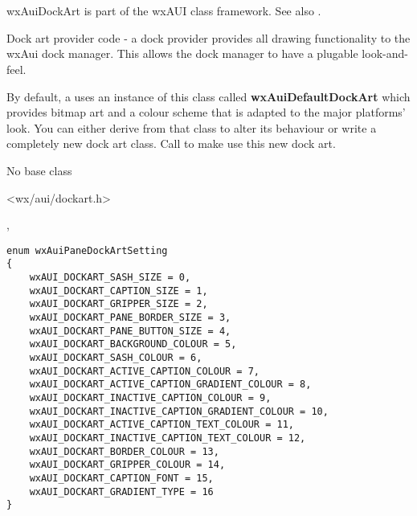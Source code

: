 %
%

\section{}\label{wxauidockart}

wxAuiDockArt is part of the wxAUI class framework.
See also .

Dock art provider code - a dock provider provides all drawing
functionality to the wxAui dock manager. This allows the dock
manager to have a plugable look-and-feel.

By default, a  uses an
instance of this class called {\bf wxAuiDefaultDockArt} which
provides bitmap art and a colour scheme that is adapted to
the major platforms' look. You can either derive from that
class to alter its behaviour or write a completely new dock
art class. Call 
to make use this new dock art.


No base class


<wx/aui/dockart.h>


, 


\begin{verbatim}
enum wxAuiPaneDockArtSetting
{
    wxAUI_DOCKART_SASH_SIZE = 0,
    wxAUI_DOCKART_CAPTION_SIZE = 1,
    wxAUI_DOCKART_GRIPPER_SIZE = 2,
    wxAUI_DOCKART_PANE_BORDER_SIZE = 3,
    wxAUI_DOCKART_PANE_BUTTON_SIZE = 4,
    wxAUI_DOCKART_BACKGROUND_COLOUR = 5,
    wxAUI_DOCKART_SASH_COLOUR = 6,
    wxAUI_DOCKART_ACTIVE_CAPTION_COLOUR = 7,
    wxAUI_DOCKART_ACTIVE_CAPTION_GRADIENT_COLOUR = 8,
    wxAUI_DOCKART_INACTIVE_CAPTION_COLOUR = 9,
    wxAUI_DOCKART_INACTIVE_CAPTION_GRADIENT_COLOUR = 10,
    wxAUI_DOCKART_ACTIVE_CAPTION_TEXT_COLOUR = 11,
    wxAUI_DOCKART_INACTIVE_CAPTION_TEXT_COLOUR = 12,
    wxAUI_DOCKART_BORDER_COLOUR = 13,
    wxAUI_DOCKART_GRIPPER_COLOUR = 14,
    wxAUI_DOCKART_CAPTION_FONT = 15,
    wxAUI_DOCKART_GRADIENT_TYPE = 16
}
\end{verbatim}

